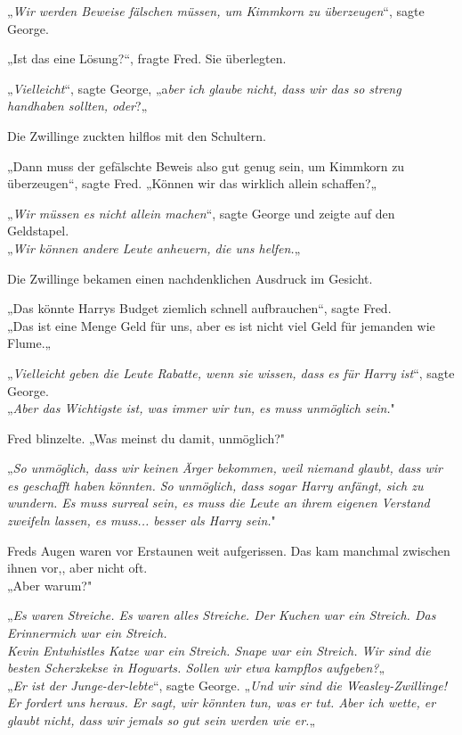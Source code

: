{„\emph{Wir werden Beweise fälschen müssen, um Kimmkorn zu überzeugen}“, sagte George.

„Ist das eine Lösung?“, fragte Fred. Sie überlegten.

„\emph{Vielleicht}“, sagte George, „a\emph{ber ich glaube nicht, dass wir das so streng handhaben sollten, oder}?„

Die Zwillinge zuckten hilflos mit den Schultern.

„Dann muss der gefälschte Beweis also gut genug sein, um Kimmkorn zu überzeugen“, sagte Fred. „Können wir das wirklich allein schaffen?„

„\emph{Wir müssen es nicht allein machen}“, sagte George und zeigte auf den Geldstapel.\\ „\emph{Wir können andere Leute anheuern, die uns helfen.}„

Die Zwillinge bekamen einen nachdenklichen Ausdruck im Gesicht.

„Das könnte Harrys Budget ziemlich schnell aufbrauchen“, sagte Fred.\\ „Das ist eine Menge Geld für uns, aber es ist nicht viel Geld für jemanden wie Flume.„

„\emph{Vielleicht geben die Leute Rabatte, wenn sie wissen, dass es für Harry ist}“, sagte George.\\ „\emph{Aber das Wichtigste ist, was immer wir tun, es muss unmöglich sein.}"

Fred blinzelte. „Was meinst du damit, unmöglich?"

„\emph{So unmöglich, dass wir keinen Ärger bekommen, weil niemand glaubt, dass wir es geschafft haben könnten. So unmöglich, dass sogar Harry anfängt, sich zu wundern. Es muss surreal sein, es muss die Leute an ihrem eigenen Verstand zweifeln lassen, es muss... besser als Harry sein.}"

Freds Augen waren vor Erstaunen weit aufgerissen. Das kam manchmal zwischen ihnen vor,, aber nicht oft.\\ „Aber warum?"

„\emph{Es waren Streiche. Es waren alles Streiche. Der Kuchen war ein Streich. Das Erinnermich war ein Streich.\\ Kevin Entwhistles Katze war ein Streich. Snape war ein Streich. Wir sind die besten Scherzkekse in Hogwarts. Sollen wir etwa kampflos aufgeben?}„\\ „\emph{Er ist der Junge-der-lebte}“, sagte George. „\emph{Und wir sind die Weasley-Zwillinge!\\ Er fordert uns heraus. Er sagt, wir könnten tun, was er tut. Aber ich wette, er glaubt nicht, dass wir jemals so gut sein werden wie er.}„

}
